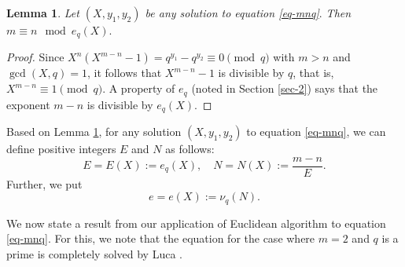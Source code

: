\documentclass[11pt]{amsart}
\newtheorem{lem}{Lemma}[section]
\numberwithin{equation}{section}
\begin{document}
\begin{lem}\label{lem-EucAlg-mminusn}
Let $(X,y_1,y_2)$ be any solution to equation \eqref{eq-mnq}$.$
Then $m \equiv n \mod{e_{q}(X)}.$
\end{lem}

\begin{proof}
Since $X^n(X^{m-n}-1)=q^{y_1}-q^{y_2} \equiv 0 \pmod{q}$ with $m>n$ and $\gcd(X,q)=1$, it follows that $X^{m-n}-1$ is divisible by $q$, that is, $X^{m-n} \equiv 1 \pmod{q}$. 
A property of $e_q$ (noted in Section \ref{sec-2}) says that the exponent $m-n$ is divisible by $e_{q}(X)$.
\end{proof}

Based on Lemma \ref{lem-EucAlg-mminusn}, for any solution $(X,y_1,y_2)$ to equation \eqref{eq-mnq}, we can define positive integers $E$ and $N$ as follows:
\[
E=E(X):=e_{q}(X), \quad N=N(X):=\frac{m-n}{E}.
\]
Further, we put
\[
e=e(X):=\nu_{q}(N).
\]

We now state a result from our application of Euclidean algorithm to equation \eqref{eq-mnq}.
For this, we note that the equation for the case where $m=2$ and $q$ is a prime is completely solved by Luca \cite{Lu2}.
\end{document}
